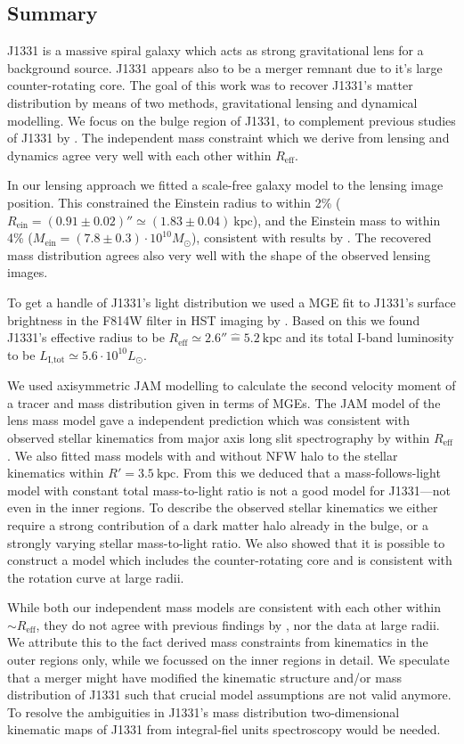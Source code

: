 \subsection{Summary}

J1331 is a massive spiral galaxy which acts as strong gravitational lens for a background source. J1331 appears also to be a merger remnant due to it's large counter-rotating core. The goal of this work was to recover J1331's matter distribution by means of two methods, gravitational lensing and dynamical modelling. We focus on the bulge region of J1331, to complement previous studies of J1331 by \citet{SWELLSIII,SWELLSV}. The independent mass constraint which we derive from lensing and dynamics agree very well with each other within $R_\text{eff}$.

In our lensing approach we fitted a scale-free galaxy model to the lensing image position. This constrained the Einstein radius to within 2\% ($R_\text{ein}=(0.91\pm0.02)''\simeq(1.83\pm0.04)~\text{kpc}$), and the Einstein mass to within 4\% ($M_\text{ein} = (7.8\pm0.3) \cdot 10^{10} M_\odot$), consistent with results by \citet{SWELLSIII}. The recovered mass distribution agrees also very well with the shape of the observed lensing images.

To get a handle of J1331's light distribution we used a MGE fit to J1331's surface brightness in the F814W filter in HST imaging by \citet{SWELLSI}. Based on this we found J1331's effective radius to be $R_\text{eff} \simeq 2.6'' \hat{=} 5.2~\text{kpc}$ and its total I-band luminosity to be $L_\text{I,tot} \simeq 5.6 \cdot 10^{10} L_\odot$.

We used axisymmetric JAM modelling to calculate the second velocity moment of a tracer and mass distribution given in terms of MGEs. The JAM model of the lens mass model gave a independent prediction which was consistent with observed stellar kinematics from major axis long slit spectrography by \citet{SWELLSV} within $R_\text{eff}$. We also fitted mass models with and without NFW halo to the stellar kinematics within $R'=3.5~\text{kpc}$. From this we deduced that a mass-follows-light model with constant total mass-to-light ratio is not a good model for J1331---not even in the inner regions. To describe the observed stellar kinematics we either require a strong contribution of a dark matter halo already in the bulge, or a strongly varying stellar mass-to-light ratio. We also showed that it is possible to construct a model which includes the counter-rotating core and is consistent with the rotation curve at large radii.

While both our independent mass models are consistent with each other within $\sim R_\text{eff}$, they do not agree with previous findings by \citet{SWELLSV}, nor the data at large radii. We attribute this to the fact \citet{SWELLSV} derived mass constraints from kinematics in the outer regions only, while we focussed on the inner regions in detail. We speculate that a merger might have modified the kinematic structure and/or mass distribution of J1331 such that crucial model assumptions are not valid anymore. To resolve the ambiguities in J1331's mass distribution two-dimensional kinematic maps of J1331 from integral-fiel units spectroscopy would be needed.